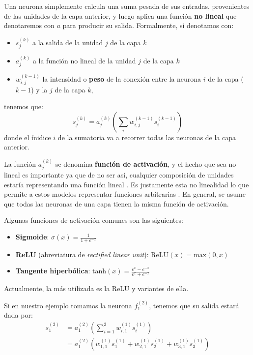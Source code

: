 \documentclass[../../main.tex]{subfiles}
\begin{document}
Una neurona simplemente calcula una suma pesada de sus entradas, provenientes de las
unidades de la capa anterior, y luego aplica una función \textbf{no lineal} que
denotaremos con \(a\) para producir su salida. Formalmente, si denotamos con:
\begin{itemize}[itemsep=0.1cm]
    \item \(s^{(k)}_j\) a la salida de la unidad \(j\) de la capa \(k\)
    \item \(a^{(k)}_j\) a la función no lineal de la unidad \(j\) de la capa \(k\)
    \item \(w^{(k-1)}_{i,j}\) la intensidad o \textbf{peso} de la conexión entre la
    neurona \(i\) de la capa (\(k-1\)) y la \(j\) de la capa \(k\),
\end{itemize}
tenemos que:
\begin{equation}
    s^{(k)}_j = a^{(k)}_j \left( \sum_i w^{(k-1)}_{i,j} s^{(k-1)}_i \right)
    \label{eq:neuron}
\end{equation}
donde el ínidice \(i\) de la sumatoria va a recorrer todas las neuronas de la capa
anterior.


La función \(a^{(k)}_j\) se denomina \textbf{función de activación}, y el hecho que sea no
lineal es importante ya que de no ser así, cualquier composición de unidades estaría
representando una función lineal \cite{ai-a-modern-approach}. Es justamente esta no
linealidad lo que permite a estos modelos representar funciones arbitrarias
\cite{ai-a-modern-approach}. En general, se asume que todas las neuronas de una capa
tienen la misma función de activación.

Algunas funciones de activación comunes son las siguientes:
\begin{itemize}[itemsep=0.1cm]
    \item \textbf{Sigmoide}: \(\sigma(x)=\frac{1}{1+e^{-x}}\)
    \item \textbf{ReLU} (abreviatura de \textit{rectified linear unit}):
    \(\text{ReLU}(x) = \text{max}(0, x)\)
    \item \textbf{Tangente hiperbólica}: \(\text{tanh}(x)=\frac{e^x - e^{-x}}{e^x + e^{-x}}\)
\end{itemize}
Actualmente, la más utilizada es la ReLU y variantes de ella.

Si en nuestro ejemplo tomamos la neurona \(f^{(2)}_1\), tenemos que su salida estará dada
por:
\begin{align*}
    s^{(2)}_1 &= a^{(2)}_1 \left( \sum_{i=1}^{3} w^{(1)}_{i,1} s^{(1)}_i \right) \\
              &= a^{(2)}_1 \left( w^{(1)}_{1,1}s^{(1)}_1 +  w^{(1)}_{2,1}s^{(1)}_2 + w^{(1)}_{3,1}s^{(1)}_3 \right)
\end{align*}
\end{document}
